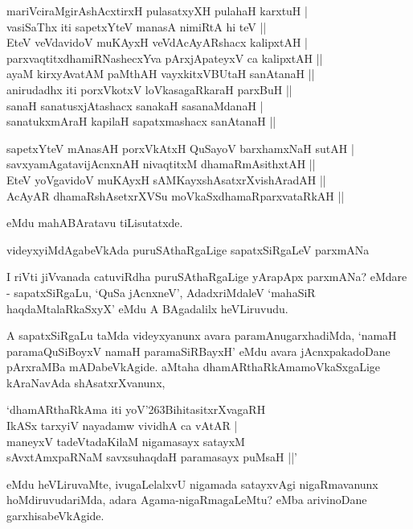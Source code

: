 \begin{shloka}
mariVciraMgirAshAcxtirxH pulasatxyXH pulahaH karxtuH |\\
vasiSaThx iti sapetxYteV manasA nimiRtA hi teV ||\\

EteV veVdavidoV muKAyxH veVdAcAyARshacx kalipxtAH |\\
parxvaqtitxdhamiRNashecxYva pArxjApateyxV ca kalipxtAH ||\\

ayaM kirxyAvatAM paMthAH vayxkitxVBUtaH sanAtanaH ||\\
anirudadhx iti porxVkotxV loVkasagaRkaraH parxBuH ||\\

sanaH sanatusxjAtashacx sanakaH sasanaMdanaH |\\
sanatukxmAraH kapilaH sapatxmashacx sanAtanaH ||

sapetxYteV mAnasAH porxVkAtxH QuSayoV barxhamxNaH sutAH |\\
savxyamAgatavijAcnxnAH nivaqtitxM dhamaRmAsithxtAH ||\\

EteV yoVgavidoV muKAyxH sAMKayxshAsatxrXvishAradAH ||\\
AcAyAR dhamaRshAsetxrXVSu moVkaSxdhamaRparxvataRkAH ||
\end{shloka}

eMdu mahABAratavu tiLisutatxde.

videyxyiMdAgabeVkAda puruSAthaRgaLige sapatxSiRgaLeV parxmANa

I riVti jiVvanada catuviRdha puruSAthaRgaLige yArapApx parxmANa? eMdare - sapatxSiRgaLu, `QuSa jAcnxneV', AdadxriMdaleV `mahaSiR haqdaMtalaRkaSxyX' eMdu A BAgadalilx heVLiruvudu.

A sapatxSiRgaLu taMda videyxyanunx avara paramAnugarxhadiMda, `namaH paramaQuSiBoyxV namaH paramaSiRBayxH' eMdu avara jAcnxpakadoDane pArxraMBa mADabeVkAgide. aMtaha dhamARthaRkAmamoVkaSxgaLige kAraNavAda shAsatxrXvanunx,

\begin{shloka}
`dhamARthaRkAma iti yoV\char'263BihitasitxrXvagaRH\\
IkASx tarxyiV nayadamw vividhA ca vAtAR |\\
maneyxV tadeVtadaKilaM nigamasayx satayxM\\
sAvxtAmxpaRNaM savxsuhaqdaH paramasayx puMsaH ||'
\end{shloka}

eMdu heVLiruvaMte, ivugaLelalxvU nigamada satayxvAgi nigaRmavanunx hoMdiruvudariMda, adara Agama-nigaRmagaLeMtu? eMba arivinoDane garxhisabeVkAgide.

